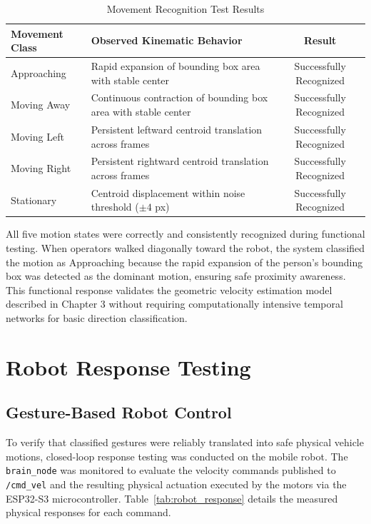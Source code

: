 \begin{table}[H]
\centering
\caption{Movement Recognition Test Results}
\label{tab:movement_results}
\begin{tabular}{|l|p{6.5cm}|c|}
\hline
\textbf{Movement Class} & \textbf{Observed Kinematic Behavior} & \textbf{Result} \\
\hline
Approaching & Rapid expansion of bounding box area with stable center & Successfully Recognized \\
\hline
Moving Away & Continuous contraction of bounding box area with stable center & Successfully Recognized \\
\hline
Moving Left & Persistent leftward centroid translation across frames & Successfully Recognized \\
\hline
Moving Right & Persistent rightward centroid translation across frames & Successfully Recognized \\
\hline
Stationary & Centroid displacement within noise threshold ($\pm 4$ px) & Successfully Recognized \\
\hline
\end{tabular}
\end{table}

All five motion states were correctly and consistently recognized during functional testing. When operators walked diagonally toward the robot, the system classified the motion as Approaching because the rapid expansion of the person's bounding box was detected as the dominant motion, ensuring safe proximity awareness. This functional response validates the geometric velocity estimation model described in Chapter 3 without requiring computationally intensive temporal networks for basic direction classification.

\section{Robot Response Testing}

\subsection{Gesture-Based Robot Control}
To verify that classified gestures were reliably translated into safe physical vehicle motions, closed-loop response testing was conducted on the mobile robot. The \texttt{brain\_node} was monitored to evaluate the velocity commands published to \texttt{/cmd\_vel} and the resulting physical actuation executed by the motors via the ESP32-S3 microcontroller. Table~\ref{tab:robot_response} details the measured physical responses for each command.

